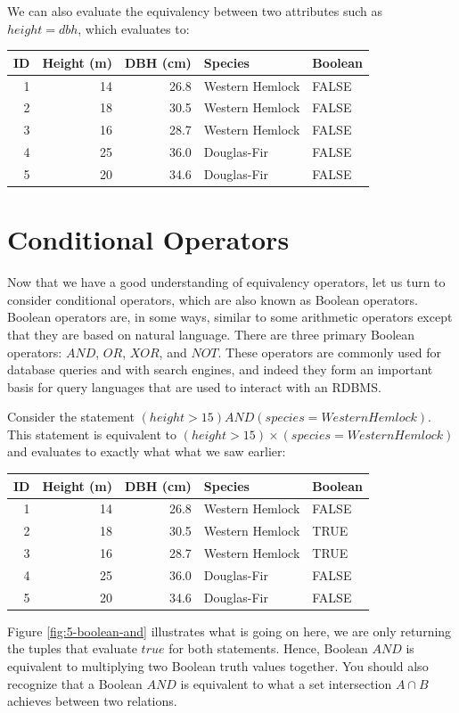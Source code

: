 \documentclass[
]{book}
\begin{document}
We can also evaluate the equivalency between two attributes such as \(height=dbh\), which evaluates to:

\begin{tabular}{rrrll}
\toprule
ID & Height (m) & DBH (cm) & Species & Boolean\\
\midrule
1 & 14 & 26.8 & Western Hemlock & FALSE\\
2 & 18 & 30.5 & Western Hemlock & FALSE\\
3 & 16 & 28.7 & Western Hemlock & FALSE\\
4 & 25 & 36.0 & Douglas-Fir & FALSE\\
5 & 20 & 34.6 & Douglas-Fir & FALSE\\
\bottomrule
\end{tabular}

\section{Conditional Operators}\label{conditional-operators}

Now that we have a good understanding of equivalency operators, let us turn to consider conditional operators, which are also known as Boolean operators. Boolean operators are, in some ways, similar to some arithmetic operators except that they are based on natural language. There are three primary Boolean operators: \(AND\), \(OR\), \(XOR\), and \(NOT\). These operators are commonly used for database queries and with search engines, and indeed they form an important basis for query languages that are used to interact with an RDBMS.

Consider the statement \((height>15)AND(species=WesternHemlock)\). This statement is equivalent to \((height>15)×(species=WesternHemlock)\) and evaluates to exactly what what we saw earlier:

\begin{tabular}{rrrll}
\toprule
ID & Height (m) & DBH (cm) & Species & Boolean\\
\midrule
1 & 14 & 26.8 & Western Hemlock & FALSE\\
2 & 18 & 30.5 & Western Hemlock & TRUE\\
3 & 16 & 28.7 & Western Hemlock & TRUE\\
4 & 25 & 36.0 & Douglas-Fir & FALSE\\
5 & 20 & 34.6 & Douglas-Fir & FALSE\\
\bottomrule
\end{tabular}

Figure \ref{fig:5-boolean-and} illustrates what is going on here, we are only returning the tuples that evaluate \(true\) for both statements. Hence, Boolean \(AND\) is equivalent to multiplying two Boolean truth values together. You should also recognize that a Boolean \(AND\) is equivalent to what a set intersection \(A∩B\) achieves between two relations.
\end{document}
